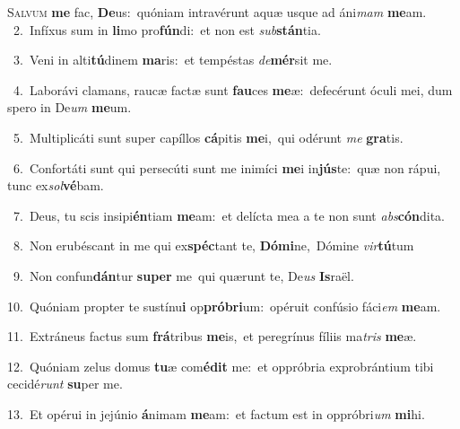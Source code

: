 \lettrine{\initial\textcolor{\initialcolor}{S}}{alvum} \textbf{me} fac, \textbf{De}\-us:~\star quóniam intravérunt aquæ usque ad áni\textit{mam} \textbf{me}\-am.\\
{\numbfont\textcolor{\numbcolor}{~2.}}~Infíxus sum in \textbf{li}\-mo pro\-\textbf{fún}\-di:~\star et non est \textit{sub}\-\textbf{stán}tia.\par
{\numbfont\textcolor{\numbcolor}{~3.}}~Veni in alti\-\textbf{tú}\-dinem \textbf{ma}\-ris:~\star et tempéstas \textit{de}\-\textbf{mér}sit me.\par
{\numbfont\textcolor{\numbcolor}{~4.}}~Laborávi clamans, raucæ factæ sunt \textbf{fau}\-ces \textbf{me}\-æ:~\star defecérunt óculi mei, dum spero in De\textit{um} \textbf{me}\-um.\par
{\numbfont\textcolor{\numbcolor}{~5.}}~Multiplicáti sunt super capíllos \textbf{cá}\-pitis \textbf{me}\-i,~\star qui odérunt \textit{me} \textbf{gra}\-tis.\par
{\numbfont\textcolor{\numbcolor}{~6.}}~Confortáti sunt qui persecúti sunt me inimíci \textbf{me}\-i in\-\textbf{jús}\-te:~\star quæ non rápui, tunc ex\-\textit{sol}\-\textbf{vé}bam.\par
{\numbfont\textcolor{\numbcolor}{~7.}}~Deus, tu scis insipi\-\textbf{én}\-tiam \textbf{me}\-am:~\star et delícta mea a te non sunt \textit{abs}\-\textbf{cón}dita.\par
{\numbfont\textcolor{\numbcolor}{~8.}}~Non erubéscant in me qui ex\-\textbf{spéc}\-tant te, \textbf{Dó}\-\textbf{mi}ne,~\star Dómine \textit{vir}\-\textbf{tú}tum\par
{\numbfont\textcolor{\numbcolor}{~9.}}~Non confun\-\textbf{dán}\-tur \textbf{su}\-\textbf{per} me~\star qui quærunt te, De\textit{us} \textbf{Is}\-raël.\par
{\numbfont\textcolor{\numbcolor}{10.}}~Quóniam propter te sustínu\textbf{i} op\-\textbf{pró}\-\textbf{bri}um:~\star opéruit confúsio fáci\textit{em} \textbf{me}\-am.\par
{\numbfont\textcolor{\numbcolor}{11.}}~Extráneus factus sum \textbf{frá}\-tribus \textbf{me}\-is,~\star et peregrínus fíliis ma\textit{tris} \textbf{me}\-æ.\par
{\numbfont\textcolor{\numbcolor}{12.}}~Quóniam zelus domus \textbf{tu}\-æ com\-\textbf{é}\-\textbf{dit} me:~\star et oppróbria exprobrántium tibi cecidé\textit{runt} \textbf{su}\-per me.\par
{\numbfont\textcolor{\numbcolor}{13.}}~Et opérui in jejúnio \textbf{á}\-nimam \textbf{me}\-am:~\star et factum est in oppróbri\textit{um} \textbf{mi}\-hi.\par
